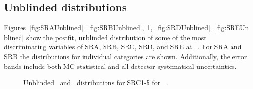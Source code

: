 


\subsection{Unblinded distributions}
\label{sec:unblindedDists}

Figures~\ref{fig:SRAUnblined},~\ref{fig:SRBUnblined},~\ref{fig:SRCUnblined},~\ref{fig:SRDUnblined},~\ref{fig:SREUnblined} show the postfit, unblinded distribution of some of the most discriminating variables of SRA, SRB, SRC, SRD, and SRE at \intlumi\ \ifb. For SRA and SRB the distributions for individual categories are shown. Additionally, the error bands include both MC statistical and all detector systematical uncertainties. 


\begin{figure}[!hp] 
\begin{center}
\caption{Unblinded \rISR\ and \pTISR\ distributions for SRC1-5 for \intlumi\ \ifb.}
\label{fig:SRCUnblined}
\end{center}
\end{figure}





